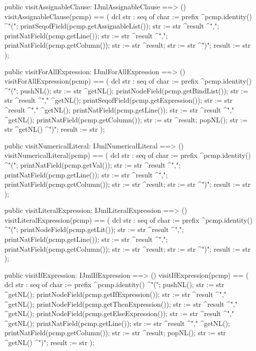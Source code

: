 \begin{vdm_al}
  public visitAssignableClause: IJmlAssignableClause ==> ()
  visitAssignableClause(pcmp) ==
    ( dcl str : seq of char := prefix ^pcmp.identity() ^"(";
      printSeqofField(pcmp.getAssignableList());
      str := str ^result ^",";
      printNatField(pcmp.getLine());
      str := str ^result ^",";
      printNatField(pcmp.getColumn());
      str := str ^result;
      str := str ^")";
      result := str );

  public visitForAllExpression: IJmlForAllExpression ==> ()
  visitForAllExpression(pcmp) ==
    ( dcl str : seq of char := prefix ^pcmp.identity() ^"(";
      pushNL();
      str := str ^getNL();
      printNodeField(pcmp.getBindList());
      str := str ^result ^"," ^getNL();
      printSeqofField(pcmp.getExpression());
      str := str ^result ^"," ^getNL();
      printNatField(pcmp.getLine());
      str := str ^result ^"," ^getNL();
      printNatField(pcmp.getColumn());
      str := str ^result;
      popNL();
      str := str ^getNL() ^")";
      result := str );

  public visitNumericalLiteral: IJmlNumericalLiteral ==> ()
  visitNumericalLiteral(pcmp) ==
    ( dcl str : seq of char := prefix ^pcmp.identity() ^"(";
      printNatField(pcmp.getVal());
      str := str ^result ^",";
      printNatField(pcmp.getLine());
      str := str ^result ^",";
      printNatField(pcmp.getColumn());
      str := str ^result;
      str := str ^")";
      result := str );

  public visitLiteralExpression: IJmlLiteralExpression ==> ()
  visitLiteralExpression(pcmp) ==
    ( dcl str : seq of char := prefix ^pcmp.identity() ^"(";
      printNodeField(pcmp.getLit());
      str := str ^result ^",";
      printNatField(pcmp.getLine());
      str := str ^result ^",";
      printNatField(pcmp.getColumn());
      str := str ^result;
      str := str ^")";
      result := str );

  public visitIfExpression: IJmlIfExpression ==> ()
  visitIfExpression(pcmp) ==
    ( dcl str : seq of char := prefix ^pcmp.identity() ^"(";
      pushNL();
      str := str ^getNL();
      printNodeField(pcmp.getIfExpression());
      str := str ^result ^"," ^getNL();
      printNodeField(pcmp.getThenExpression());
      str := str ^result ^"," ^getNL();
      printNodeField(pcmp.getElseExpression());
      str := str ^result ^"," ^getNL();
      printNatField(pcmp.getLine());
      str := str ^result ^"," ^getNL();
      printNatField(pcmp.getColumn());
      str := str ^result;
      popNL();
      str := str ^getNL() ^")";
      result := str );


\end{vdm_al}
